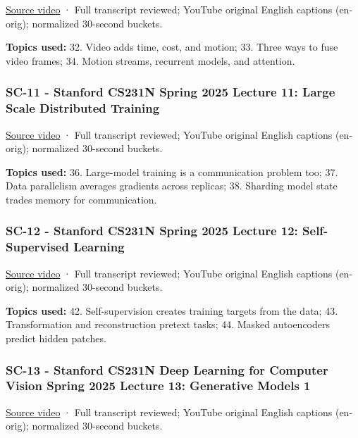 \href{https://www.youtube.com/watch?v=wElqklprhPE}{Source video} · Full transcript reviewed; YouTube original English captions (en-orig); normalized 30-second buckets.

\textbf{Topics used:} 32. Video adds time, cost, and motion; 33. Three ways to fuse video frames; 34. Motion streams, recurrent models, and attention.

\subsubsection{SC-11 - Stanford CS231N Spring 2025 Lecture 11: Large Scale Distributed Training}\label{04-visual-computing-ii-ch036-sc-11---stanford-cs231n-spring-2025-lecture-11-large-scale-distributed-training}

\href{https://www.youtube.com/watch?v=9MvD-XsowsE}{Source video} · Full transcript reviewed; YouTube original English captions (en-orig); normalized 30-second buckets.

\textbf{Topics used:} 36. Large-model training is a communication problem too; 37. Data parallelism averages gradients across replicas; 38. Sharding model state trades memory for communication.

\subsubsection{SC-12 - Stanford CS231N Spring 2025 Lecture 12: Self-Supervised Learning}\label{04-visual-computing-ii-ch036-sc-12---stanford-cs231n-spring-2025-lecture-12-self-supervised-learning}

\href{https://www.youtube.com/watch?v=4howBU7THbM}{Source video} · Full transcript reviewed; YouTube original English captions (en-orig); normalized 30-second buckets.

\textbf{Topics used:} 42. Self-supervision creates training targets from the data; 43. Transformation and reconstruction pretext tasks; 44. Masked autoencoders predict hidden patches.

\subsubsection{SC-13 - Stanford CS231N Deep Learning for Computer Vision Spring 2025 Lecture 13: Generative Models 1}\label{04-visual-computing-ii-ch036-sc-13---stanford-cs231n-deep-learning-for-computer-vision-spring-2025-lecture-13-generative-models-1}

\href{https://www.youtube.com/watch?v=zbHXQRUNlH0}{Source video} · Full transcript reviewed; YouTube original English captions (en-orig); normalized 30-second buckets.

